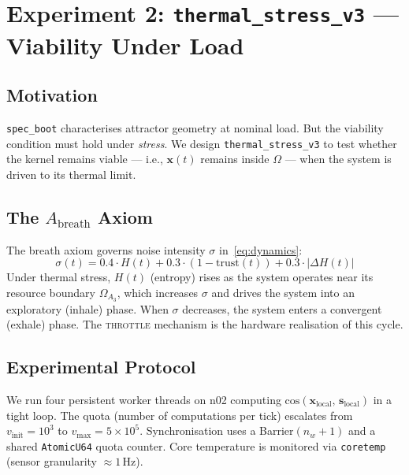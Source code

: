 \documentclass[11pt, a4paper]{article}
\newcommand{\stasis}{\bm{s}}
\newcommand{\sv}{\bm{x}}
\newcommand{\cosim}[2]{\mathrm{cos}\!\left(#1,\, #2\right)}
\begin{document}
\section{Experiment 2: \texttt{thermal\_stress\_v3} — Viability Under Load}
\label{sec:thermal}

\subsection{Motivation}

\texttt{spec\_boot} characterises attractor geometry at nominal load.
But the viability condition must hold under \emph{stress}.
We design \texttt{thermal\_stress\_v3} to test whether the kernel remains
viable — i.e., $\sv(t)$ remains inside $\Omega$ — when the system is
driven to its thermal limit.

\subsection{The \texorpdfstring{$A_\text{breath}$}{A\_breath} Axiom}

The breath axiom governs noise intensity $\sigma$ in~\eqref{eq:dynamics}:
\begin{equation}
  \sigma(t) = 0.4 \cdot H(t) + 0.3 \cdot (1 - \mathrm{trust}(t))
              + 0.3 \cdot |\Delta H(t)|
\label{eq:breath}
\end{equation}
Under thermal stress, $H(t)$ (entropy) rises as the system operates near
its resource boundary $\Omega_{A_3}$, which increases $\sigma$ and drives
the system into an exploratory (inhale) phase.
When $\sigma$ decreases, the system enters a convergent (exhale) phase.
The \textsc{throttle} mechanism is the hardware realisation of this cycle.

\subsection{Experimental Protocol}

We run four persistent worker threads on n02 computing
$\cosim{\sv_\text{local}}{\stasis_\text{local}}$ in a tight loop.
The quota (number of computations per tick) escalates from
$v_\text{init} = 10^3$ to $v_\text{max} = 5 \times 10^5$.
Synchronisation uses a Barrier$(n_w + 1)$ and a shared \texttt{AtomicU64}
quota counter.
Core temperature is monitored via \texttt{coretemp} (sensor granularity $\approx 1$\,Hz).
\end{document}
